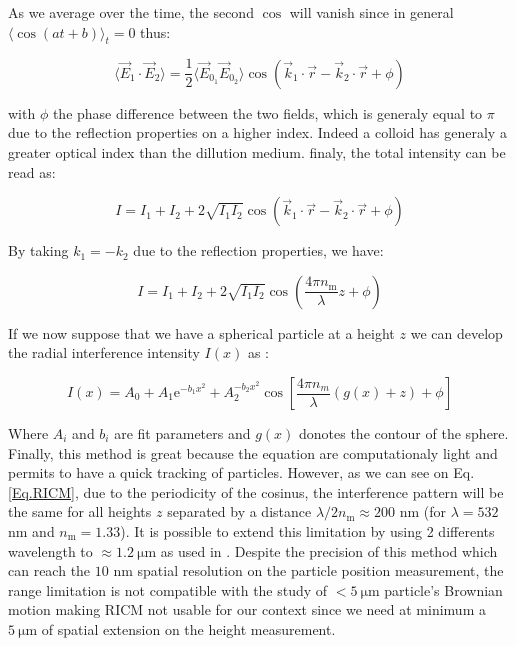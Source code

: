 As we average over the time, the second $\cos$ will vanish since in general $\langle \cos(at + b) \rangle_ t = 0$ thus:

\begin{equation}
	\langle \vec{E}_1 \cdot \vec{E}_2 \rangle = \frac{1}{2} \langle  \vec{E}_{0_1}  \vec{E}_{0_2} \rangle
	\cos 
	\left(
	\vec{k}_1 \cdot \vec{r} - \vec{k}_2 \cdot \vec{r} + \phi	
	\right)	
\end{equation}

with $\phi$ the phase difference between the two fields, which is generaly equal to $\pi$ due to the reflection properties on a higher index. Indeed a colloid has generaly a greater optical index than the dillution medium.  finaly, the total intensity can be read as:


\begin{equation}
	I = I_1 + I_2 + 2 \sqrt{I_1 I_2} 
	\cos 
	\left(
	\vec{k}_1 \cdot \vec{r} - \vec{k}_2 \cdot \vec{r} + \phi	
	\right)
\end{equation}

By taking $k_1 = - k_2$ due to the reflection properties, we have:


\begin{equation}
	I = I_1 + I_2 + 2 \sqrt{I_1 I_2} 
	\cos 
	\left(
	\frac{4 \pi n_{\mathrm{m}}}{\lambda} z + \phi	
	\right)
\end{equation}


If we now suppose that we have a spherical particle at a height $z$ we can develop the radial interference intensity $I(x)$ as \cite{ raedler_measurement_1992}:

\begin{equation}
	I(x) = A_0 + A_1 \mathrm{e}^{-b_1 x^2} + A_2^{-b_2 x^2} \cos \left[ \frac{4\pi n_m}{\lambda}\left( g(x) + z \right) + \phi \right]
	\label{Eq.RICM}
\end{equation}

Where $A_i$ and $b_i$ are fit parameters and $g(x)$ donotes the contour of the sphere.
Finally, this method is great because the equation are computationaly light and permits to have a quick tracking of particles. However, as we can see on Eq.\ref{Eq.RICM}, due to the periodicity of the cosinus, the interference pattern will be the same for all heights $z$ separated by a distance $\lambda / 2n_\mathrm{m} \approx 200 $ nm (for $\lambda = 532$ nm and $n_{\mathrm{m}} = 1.33$). It is possible to extend this limitation by using 2 differents wavelength to $\approx 1.2 ~ \mathrm{\mu m}$ as used in \cite{davies_elastohydrodynamic_2018}. Despite the precision of this method which can reach the $10$ nm spatial resolution on the particle position measurement, the range limitation is not compatible with the study of $ <5 ~ \mathrm{\mu m}$ particle's Brownian motion making \gls{RICM} not usable for our context since we need at minimum a $5~\mathrm{\mu m}$ of spatial extension on the height measurement.



